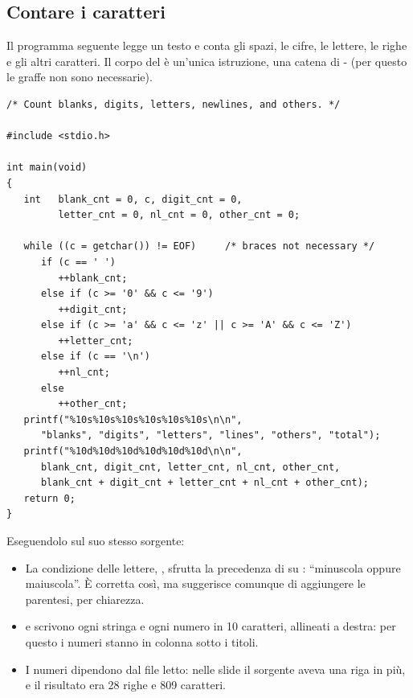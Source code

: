\subsection{Contare i caratteri}

Il programma seguente legge un testo e conta gli spazi, le cifre, le lettere,
le righe e gli altri caratteri. Il corpo del  è un'unica
istruzione, una catena di - (per questo le graffe non
sono necessarie).

\begin{lstlisting}[style=c, name=cnt_char.c]
/* Count blanks, digits, letters, newlines, and others. */

#include <stdio.h>

int main(void)
{
   int   blank_cnt = 0, c, digit_cnt = 0,
         letter_cnt = 0, nl_cnt = 0, other_cnt = 0;

   while ((c = getchar()) != EOF)     /* braces not necessary */
      if (c == ' ')
         ++blank_cnt;
      else if (c >= '0' && c <= '9')
         ++digit_cnt;
      else if (c >= 'a' && c <= 'z' || c >= 'A' && c <= 'Z')
         ++letter_cnt;
      else if (c == '\n')
         ++nl_cnt;
      else
         ++other_cnt;
   printf("%10s%10s%10s%10s%10s%10s\n\n",
      "blanks", "digits", "letters", "lines", "others", "total");
   printf("%10d%10d%10d%10d%10d%10d\n\n",
      blank_cnt, digit_cnt, letter_cnt, nl_cnt, other_cnt,
      blank_cnt + digit_cnt + letter_cnt + nl_cnt + other_cnt);
   return 0;
}
\end{lstlisting}


Eseguendolo sul suo stesso sorgente:


\begin{itemize}
  \item La condizione delle lettere,
        , sfrutta la
        precedenza di \code{\&\&} su \code{||}: “minuscola oppure maiuscola”.
        È corretta così, ma  suggerisce comunque di
        aggiungere le parentesi, per chiarezza.
  \item {} e  scrivono ogni stringa e ogni numero in 10
        caratteri, allineati a destra: per questo i numeri stanno in colonna
        sotto i titoli.
  \item I numeri dipendono dal file letto: nelle slide il sorgente aveva una
        riga in più, e il risultato era 28 righe e 809 caratteri.
\end{itemize}

